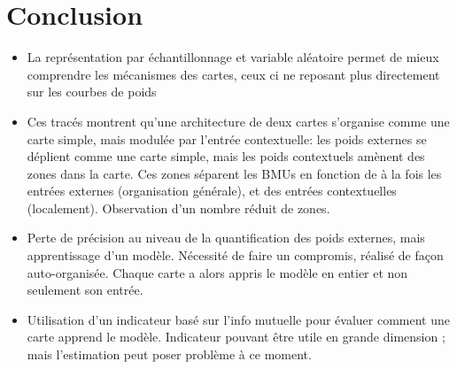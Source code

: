 



\section{Conclusion}
\begin{itemize}
\item La représentation par échantillonnage et variable aléatoire permet de mieux comprendre les mécanismes des cartes, ceux ci ne reposant plus directement sur les courbes de poids
\item Ces tracés montrent qu'une architecture de deux cartes s'organise comme une carte simple, mais modulée par l'entrée contextuelle: les poids externes se déplient comme une carte simple, mais les poids contextuels amènent des zones dans la carte. Ces zones séparent les BMUs en fonction de à la fois les entrées externes (organisation générale), et des entrées contextuelles (localement). Observation d'un nombre réduit de zones. 
\item Perte de précision au niveau de la quantification des poids externes, mais apprentissage d'un modèle. Nécessité de faire un compromis, réalisé de façon auto-organisée. Chaque carte a alors appris le modèle en entier et non seulement son entrée.
\item Utilisation d'un indicateur basé sur l'info mutuelle pour évaluer comment une carte apprend le modèle. Indicateur pouvant être utile en grande dimension ; mais l'estimation peut poser problème à ce moment.
\end{itemize}


